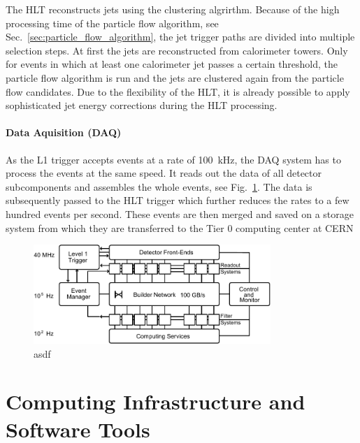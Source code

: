 The HLT reconstructs jets using the \antikt clustering algrirthm. Because of the
high processing time of the particle flow algorithm, see
Sec.~\ref{sec:particle_flow_algorithm}, the jet trigger paths are divided into
multiple selection steps. At first the jets are reconstructed from calorimeter
towers.  Only for events in which at least one calorimeter jet passes a certain
\pt threshold, the particle flow algorithm is run and the jets are clustered
again from the particle flow candidates. Due to the flexibility of the HLT, it
is already possible to apply sophisticated jet energy corrections during the HLT
processing.

\paragraph{Data Aquisition (DAQ)}

As the L1 trigger accepts events at a rate of \SI{100}{\kilo\hertz}, the DAQ
system has to process the events at the same speed. It reads out the data of all
detector subcomponents and assembles the whole events, see
Fig.~\ref{fig:cms:daq_system}. The data is subsequently passed to the HLT
trigger which further reduces the rates to a few hundred events per second.
These events are then merged and saved on a storage system from which they are
transferred to the Tier 0 computing center at CERN 

\begin{figure}[h!tp]
    \centering
    \includegraphics[width=0.8\textwidth]{figures/cms_detector/cms_daq.pdf}\hfill
    \caption[The DAQ System of CMS]{asdf~\cite{Sphicas:2002gg}}
    \label{fig:cms:daq_system}
\end{figure}

\section{Computing Infrastructure and Software Tools}

